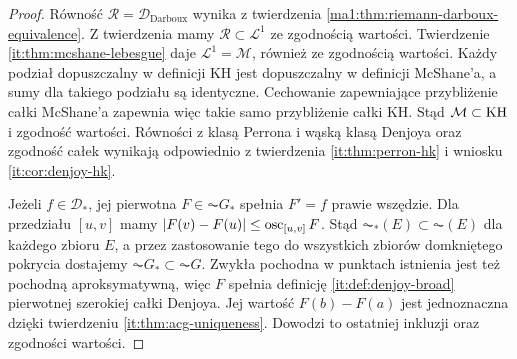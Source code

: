 \begin{proof}
Równość $\mathcal R=\mathcal D_{\mathrm{Darboux}}$
wynika z twierdzenia \ref{ma1:thm:riemann-darboux-equivalence}.
Z twierdzenia
mamy $\mathcal R\subset\mathcal L^1$ ze zgodnością wartości.
Twierdzenie \ref{it:thm:mcshane-lebesgue} daje
$\mathcal L^1=\mathcal M$, również ze zgodnością wartości.
Każdy podział dopuszczalny w definicji KH jest
dopuszczalny w definicji McShane'a, a sumy dla takiego
podziału są identyczne. Cechowanie zapewniające
przybliżenie całki McShane'a zapewnia więc takie samo
przybliżenie całki KH. Stąd $\mathcal M\subset\mathrm{KH}$
i zgodność wartości.
Równości z klasą Perrona i wąską klasą Denjoya
oraz zgodność całek wynikają odpowiednio z twierdzenia
\ref{it:thm:perron-hk} i wniosku \ref{it:cor:denjoy-hk}.

Jeżeli $f\in\mathcal D_*$, jej pierwotna $F\in\AC G_*$
spełnia $F'=f$ prawie wszędzie.
Dla przedziału $[u,v]$ mamy
$|F(v)-F(u)|\le\operatorname{osc}_{[u,v]}F$.
Stąd $\AC_*(E)\subset\AC(E)$ dla każdego zbioru $E$,
a przez zastosowanie tego do wszystkich zbiorów
domkniętego pokrycia dostajemy $\AC G_*\subset\AC G$.
Zwykła pochodna w punktach istnienia jest też pochodną
aproksymatywną, więc $F$ spełnia definicję
\ref{it:def:denjoy-broad} pierwotnej szerokiej całki Denjoya.
Jej wartość $F(b)-F(a)$ jest jednoznaczna dzięki
twierdzeniu \ref{it:thm:acg-uniqueness}.
Dowodzi to ostatniej inkluzji oraz zgodności wartości.


\end{proof}
